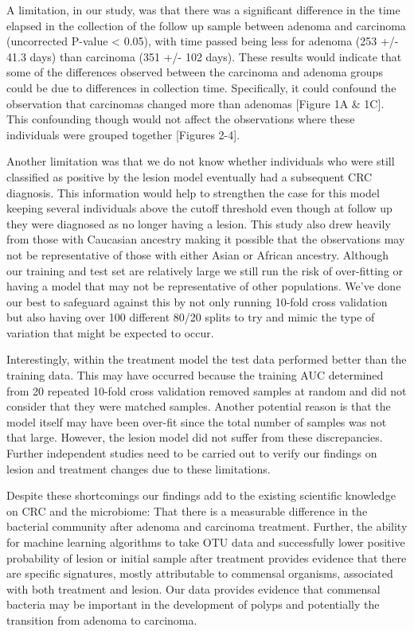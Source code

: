 \documentclass[12pt,]{article}
\begin{document}
A limitation, in our study, was that there was a significant difference
in the time elapsed in the collection of the follow up sample between
adenoma and carcinoma (uncorrected P-value \textless{} 0.05), with time
passed being less for adenoma (253 +/- 41.3 days) than carcinoma (351
+/- 102 days). These results would indicate that some of the differences
observed between the carcinoma and adenoma groups could be due to
differences in collection time. Specifically, it could confound the
observation that carcinomas changed more than adenomas {[}Figure 1A \&
1C{]}. This confounding though would not affect the observations where
these individuals were grouped together {[}Figures 2-4{]}.

Another limitation was that we do not know whether individuals who were
still classified as positive by the lesion model eventually had a
subsequent CRC diagnosis. This information would help to strengthen the
case for this model keeping several individuals above the cutoff
threshold even though at follow up they were diagnosed as no longer
having a lesion. This study also drew heavily from those with Caucasian
ancestry making it possible that the observations may not be
representative of those with either Asian or African ancestry. Although
our training and test set are relatively large we still run the risk of
over-fitting or having a model that may not be representative of other
populations. We've done our best to safeguard against this by not only
running 10-fold cross validation but also having over 100 different
80/20 splits to try and mimic the type of variation that might be
expected to occur.

Interestingly, within the treatment model the test data performed better
than the training data. This may have occurred because the training AUC
determined from 20 repeated 10-fold cross validation removed samples at
random and did not consider that they were matched samples. Another
potential reason is that the model itself may have been over-fit since
the total number of samples was not that large. However, the lesion
model did not suffer from these discrepancies. Further independent
studies need to be carried out to verify our findings on lesion and
treatment changes due to these limitations.

Despite these shortcomings our findings add to the existing scientific
knowledge on CRC and the microbiome: That there is a measurable
difference in the bacterial community after adenoma and carcinoma
treatment. Further, the ability for machine learning algorithms to take
OTU data and successfully lower positive probability of lesion or
initial sample after treatment provides evidence that there are specific
signatures, mostly attributable to commensal organisms, associated with
both treatment and lesion. Our data provides evidence that commensal
bacteria may be important in the development of polyps and potentially
the transition from adenoma to carcinoma.
\end{document}
